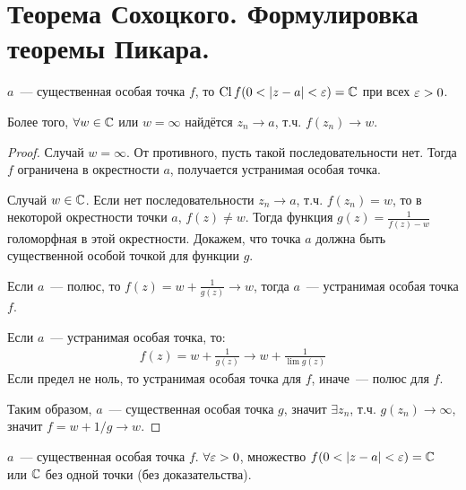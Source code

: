 \section{Теорема Сохоцкого. Формулировка теоремы Пикара.}

\begin{theorem}[Сохоцкий]

    $a$~--- существенная особая точка $f$,
    то $\operatorname{Cl} f(0 < |z-a| < \varepsilon) = \mathbb{C}$ при всех $\varepsilon > 0$.

    Более того, $\forall w \in \mathbb{C}$ или $w = \infty$
    найдётся $z_n \to a$, т.ч. $f(z_n) \to w$.
\end{theorem}

\begin{proof}
    Случай $w = \infty$.
    От противного, пусть такой последовательности нет.
    Тогда $f$ ограничена в окрестности $a$,
    получается устранимая особая точка.

    Случай $w \in \mathbb{C}$.
    Если нет последовательности $z_n \to a$,
    т.ч. $f(z_n) = w$, то в некоторой окрестности
    точки $a$, $f(z) \ne w$. Тогда функция
    $g(z) = \frac{1}{f(z) - w}$ голоморфная в
    этой окрестности.
    Докажем, что точка $a$ должна быть существенной
    особой точкой для функции $g$.

    Если $a$~--- полюс, то $f(z) = w + \frac{1}{g(z)}
        \to w$, тогда $a$~--- устранимая особая точка $f$.

    Если $a$~--- устранимая особая точка, то: 
    \begin{gather*}
        f(z) = w + \frac{1}{g(z)} \to w + \frac{1}{\lim g(z)}
    \end{gather*}
    Если предел не ноль, то устранимая особая точка для $f$,
    иначе~--- полюс для $f$.

    Таким образом, $a$~--- существенная особая точка $g$,
    значит $\exists z_n$, т.ч. $g(z_n) \to \infty$,
    значит $f = w + 1/g \to w$.
\end{proof}

\begin{theorem}[Пикар]

    $a$~--- существенная особая точка $f$.
    $\forall \varepsilon > 0$, множество $f(0 < |z-a| < \varepsilon)
        = \mathbb{C}$ или $\mathbb{C}$ без одной точки (без доказательства).
\end{theorem}

\newpage

